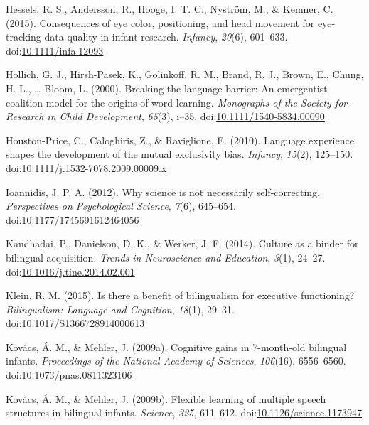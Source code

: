 \documentclass[,man,floatsintext]{apa6}
\begin{document}
\leavevmode\hypertarget{ref-Hessels_etal_2015}{}%
Hessels, R. S., Andersson, R., Hooge, I. T. C., Nyström, M., \& Kemner, C. (2015). Consequences of eye color, positioning, and head movement for eye-tracking data quality in infant research. \emph{Infancy}, \emph{20}(6), 601--633. doi:\href{https://doi.org/10.1111/infa.12093}{10.1111/infa.12093}

\leavevmode\hypertarget{ref-Hollich_etal_2000}{}%
Hollich, G. J., Hirsh-Pasek, K., Golinkoff, R. M., Brand, R. J., Brown, E., Chung, H. L., \ldots{} Bloom, L. (2000). Breaking the language barrier: An emergentist coalition model for the origins of word learning. \emph{Monographs of the Society for Research in Child Development}, \emph{65}(3), i--35. doi:\href{https://doi.org/10.1111/1540-5834.00090}{10.1111/1540-5834.00090}

\leavevmode\hypertarget{ref-Houston-Price_etal_2010}{}%
Houston-Price, C., Caloghiris, Z., \& Raviglione, E. (2010). Language experience shapes the development of the mutual exclusivity bias. \emph{Infancy}, \emph{15}(2), 125--150. doi:\href{https://doi.org/10.1111/j.1532-7078.2009.00009.x}{10.1111/j.1532-7078.2009.00009.x}

\leavevmode\hypertarget{ref-Ioannidis_2012}{}%
Ioannidis, J. P. A. (2012). Why science is not necessarily self-correcting. \emph{Perspectives on Psychological Science}, \emph{7}(6), 645--654. doi:\href{https://doi.org/10.1177/1745691612464056}{10.1177/1745691612464056}

\leavevmode\hypertarget{ref-Kandhadai_etal_2014}{}%
Kandhadai, P., Danielson, D. K., \& Werker, J. F. (2014). Culture as a binder for bilingual acquisition. \emph{Trends in Neuroscience and Education}, \emph{3}(1), 24--27. doi:\href{https://doi.org/10.1016/j.tine.2014.02.001}{10.1016/j.tine.2014.02.001}

\leavevmode\hypertarget{ref-Klein_2015}{}%
Klein, R. M. (2015). Is there a benefit of bilingualism for executive functioning? \emph{Bilingualism: Language and Cognition}, \emph{18}(1), 29--31. doi:\href{https://doi.org/10.1017/S1366728914000613}{10.1017/S1366728914000613}

\leavevmode\hypertarget{ref-Kovacs_Mehler_2009b}{}%
Kovács, Á. M., \& Mehler, J. (2009a). Cognitive gains in 7-month-old bilingual infants. \emph{Proceedings of the National Academy of Sciences}, \emph{106}(16), 6556--6560. doi:\href{https://doi.org/10.1073/pnas.0811323106}{10.1073/pnas.0811323106}

\leavevmode\hypertarget{ref-Kovacs_Mehler_2009a}{}%
Kovács, Á. M., \& Mehler, J. (2009b). Flexible learning of multiple speech structures in bilingual infants. \emph{Science}, \emph{325}, 611--612. doi:\href{https://doi.org/10.1126/science.1173947}{10.1126/science.1173947}
\end{document}
